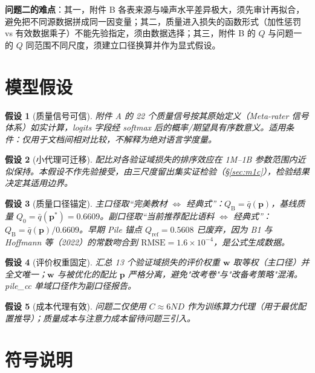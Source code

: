 \documentclass[11pt]{article}
\newtheorem{assumption}{假设}
\begin{document}
\textbf{问题二的难点}：其一，附件 B 各表来源与噪声水平差异极大，须先审计再拟合，避免把不同源数据拼成同一因变量；其二，质量进入损失的函数形式（加性惩罚 vs 有效数据乘子）不能先验指定，须由数据选择；其三，附件 B 的 $Q$ 与问题一的 $Q$ 同范围不同尺度，须建立口径换算并作为显式假设。

\section{模型假设}

\begin{assumption}[质量信号可信]\label{asm:signal}
附件 A 的 22 个质量信号按其原始定义（Meta-rater 信号体系）如实计算，logits 字段经 softmax 后的概率/期望具有序数意义。适用条件：仅用于文档间相对比较，不解释为绝对语言学度量。
\end{assumption}

\begin{assumption}[小代理可迁移]\label{asm:proxy}
配比对各验证域损失的\emph{排序}效应在 1M--1B 参数范围内近似保持。本假设不作先验接受，由三尺度留出集实证检验（\S\ref{sec:m1c}），检验结果决定其适用边界。
\end{assumption}

\begin{assumption}[质量口径锚定]\label{asm:anchor}
主口径取“完美教材 $\Leftrightarrow$ 经典式”：$Q_{\mathrm B}=\bar q(\bm p)$，基线质量 $Q_0=\bar q(\bm p^*)=0.6609$。副口径取“当前推荐配比语料 $\Leftrightarrow$ 经典式”：$Q_{\mathrm B}=\bar q(\bm p)/0.6609$。早期 Pile 锚点 $Q_{\mathrm{ref}}=0.5608$ 已废弃，因为 B1 与 Hoffmann 等（2022）的常数吻合到 $\mathrm{RMSE}=1.6\times10^{-4}$，是公式生成数据。
\end{assumption}

\begin{assumption}[评价权重固定]\label{asm:weight}
汇总 13 个验证域损失的评价权重 $\bm w$ 取等权（主口径）并全文唯一；$\bm w$ 与被优化的配比 $\bm p$ 严格分离，避免"改考卷"与"改备考策略"混淆。pile\_cc 单域口径作为副口径报告。
\end{assumption}

\begin{assumption}[成本代理有效]\label{asm:cost}
问题二仅使用 $C\approx6ND$ 作为训练算力代理（用于最优配置推导）；质量成本与注意力成本留待问题三引入。
\end{assumption}

\section{符号说明}
\end{document}
